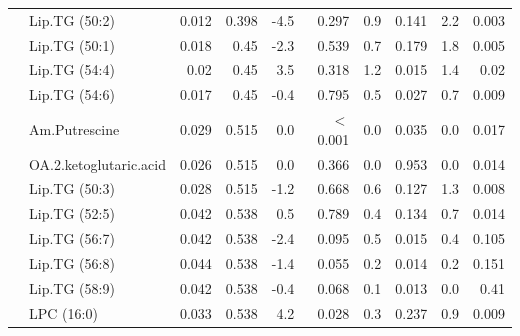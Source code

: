 \documentclass{amsart}
\begin{document}
\begin{table}[H]
\begin{threeparttable}
\begin{tabular}{clrrrrrrrr}
   & Lip.TG (50:2) & 0.012 & 0.398 & {\cellcolor[rgb]{0.973,0.471,0.478}}-4.5 & 0.297 & {\cellcolor[rgb]{0.98,0.984,0.992}}0.9 & 0.141 & {\cellcolor[rgb]{0.957,0.976,0.973}}2.2 & 0.003 \\
   & Lip.TG (50:1) & 0.018 & 0.45 & {\cellcolor[rgb]{0.98,0.706,0.714}}-2.3 & 0.539 & {\cellcolor[rgb]{0.984,0.988,0.996}}0.7 & 0.179 & {\cellcolor[rgb]{0.965,0.98,0.98}}1.8 & 0.005 \\
   & Lip.TG (54:4) & 0.02 & 0.45 & {\cellcolor[rgb]{0.937,0.969,0.953}}3.5 & 0.318 & {\cellcolor[rgb]{0.976,0.984,0.988}}1.2 & 0.015 & {\cellcolor[rgb]{0.973,0.984,0.984}}1.4 & 0.02 \\
   & Lip.TG (54:6) & 0.017 & 0.45 & {\cellcolor[rgb]{0.984,0.906,0.918}}-0.4 & 0.795 & {\cellcolor[rgb]{0.988,0.988,1}}0.5 & 0.027 & {\cellcolor[rgb]{0.984,0.988,0.996}}0.7 & 0.009 \\
   & Am.Putrescine & 0.029 & 0.515 & {\cellcolor[rgb]{0.984,0.953,0.965}}0.0 & $<$0.001 & {\cellcolor[rgb]{0.984,0.953,0.965}}0.0 & 0.035 & {\cellcolor[rgb]{0.984,0.953,0.965}}0.0 & 0.017 \\
   & OA.2.ketoglutaric.acid & 0.026 & 0.515 & {\cellcolor[rgb]{0.984,0.953,0.965}}0.0 & 0.366 & {\cellcolor[rgb]{0.984,0.953,0.965}}0.0 & 0.953 & {\cellcolor[rgb]{0.984,0.953,0.965}}0.0 & 0.014 \\
   & Lip.TG (50:3) & 0.028 & 0.515 & {\cellcolor[rgb]{0.98,0.824,0.835}}-1.2 & 0.668 & {\cellcolor[rgb]{0.984,0.988,0.996}}0.6 & 0.127 & {\cellcolor[rgb]{0.973,0.984,0.988}}1.3 & 0.008 \\
   & Lip.TG (52:5) & 0.042 & 0.538 & {\cellcolor[rgb]{0.988,0.988,1}}0.5 & 0.789 & {\cellcolor[rgb]{0.988,0.988,1}}0.4 & 0.134 & {\cellcolor[rgb]{0.984,0.988,0.996}}0.7 & 0.014 \\
   & Lip.TG (56:7) & 0.042 & 0.538 & {\cellcolor[rgb]{0.976,0.698,0.706}}-2.4 & 0.095 & {\cellcolor[rgb]{0.988,0.988,1}}0.5 & 0.015 & {\cellcolor[rgb]{0.988,0.988,1}}0.4 & 0.105 \\
   & Lip.TG (56:8) & 0.044 & 0.538 & {\cellcolor[rgb]{0.98,0.804,0.816}}-1.4 & 0.055 & {\cellcolor[rgb]{0.984,0.98,0.992}}0.2 & 0.014 & {\cellcolor[rgb]{0.984,0.973,0.984}}0.2 & 0.151 \\
   & Lip.TG (58:9) & 0.042 & 0.538 & {\cellcolor[rgb]{0.984,0.906,0.918}}-0.4 & 0.068 & {\cellcolor[rgb]{0.984,0.961,0.973}}0.1 & 0.013 & {\cellcolor[rgb]{0.984,0.957,0.969}}0.0 & 0.41 \\
   & LPC (16:0) & 0.033 & 0.538 & {\cellcolor[rgb]{0.922,0.961,0.945}}4.2 & 0.028 & {\cellcolor[rgb]{0.988,0.988,1}}0.3 & 0.237 & {\cellcolor[rgb]{0.98,0.988,0.992}}0.9 & 0.009 \\

\end{tabular}
\end{threeparttable}
\end{table}
\end{document}
